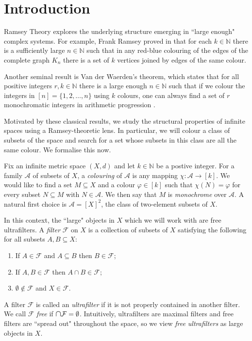 \section{Introduction}
Ramsey Theory explores the underlying structure emerging in ``large enough" complex systems. For example, Frank Ramsey proved in \cite{ramsey:1930} that for each \( k \in \mathbb{N} \) there is a sufficiently large \( n \in \mathbb{N} \) such that in any red-blue colouring of the edges of the complete graph \( K_{n} \) there is a set of \( k \) vertices joined by edges of the same colour.

Another seminal result is Van der Waerden's theorem, which states that for all positive integers \( r, k \in \mathbb{N} \) there is a large enough \( n \in \mathbb{N} \) such that if we colour the integers in \( [n] = \{ 1,2,\hdots ,n \} \) using \( k \) colours, one can always find a set of \( r \) monochromatic integers in arithmetic progression \cite{waerden:1927}.

Motivated by these classical results, we study the structural properties of infinite spaces using a Ramsey-theoretic lens. In particular, we will colour a class of subsets of the space and search for a set whose subsets in this class are all the same colour. We formalise this now.

Fix an infinite metric space \( (X,d) \) and let \( k \in \mathbb{N} \) be a postive integer. For a family \( \mathcal{A} \) of subsets of \( X \), a \emph{colouring} of \( \mathcal{A} \) is any mapping \( \chi : \mathcal{A} \to [k] \). We would like to find a set \( M \subseteq X \) and a colour \( \varphi \in [k] \) such that \( \chi(N) = \varphi \) for every subset \( N \subseteq M \) with \(N \in \mathcal{A} \). We then say that \( M \) is \emph{monochrome} over \( \mathcal{A} \). A natural first choice is \( \mathcal{A} = [X]^{2} \), the class of two-element subsets of \( X \).

In this context, the ``large" objects in \( X \) which we will work with are free ultrafilters. A \emph{filter} \( \mathcal{F} \) on \( X \) is a collection of subsets of \( X \) satisfying the following for all subsets \( A, B \subseteq X \):
\begin{enumerate}[leftmargin=1.2cm]

\item If \( A \in \mathcal{F} \) and \( A \subseteq B \) then \( B \in \mathcal{F} \);
\item If \( A, B \in \mathcal{F} \) then \( A \cap B \in \mathcal{F} \);
\item \( \emptyset \notin \mathcal{F} \) and \( X \in \mathcal{F} \).
\end{enumerate}
A filter \( \mathcal{F} \) is called an \emph{ultrafilter} if it is not properly contained in another filter. We call \( \mathcal{F} \) \emph{free} if \( \medcap \mathcal{F} = \emptyset \). Intuitively, ultrafilters are maximal filters and free filters are ``spread out" throughout the space, so we view \emph{free ultrafilters} as large objects in \( X \).

